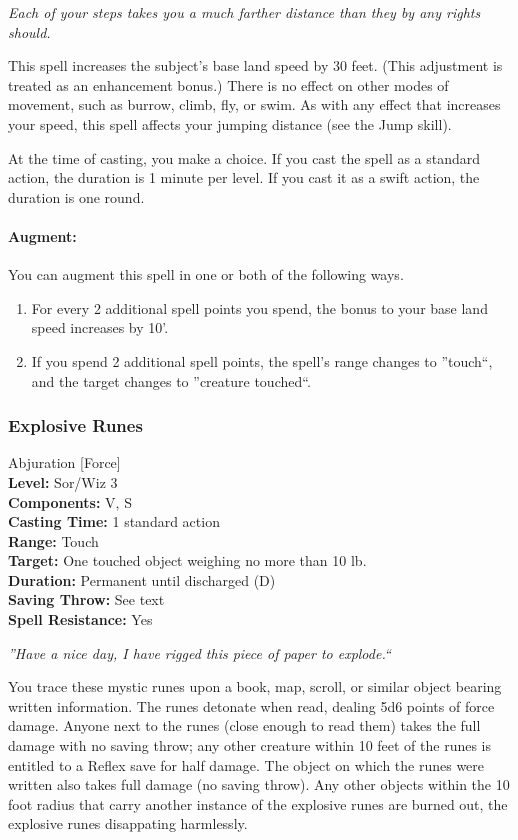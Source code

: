 \emph{Each of your steps takes you a much farther distance than they by any rights should.}

This spell increases the subject's base land speed by 30 feet. (This adjustment is treated as an enhancement bonus.) 
There is no effect on other modes of movement, such as burrow, climb, fly, or swim. 
As with any effect that increases your speed, this spell affects your jumping distance (see the Jump skill).

At the time of casting, you make a choice. If you cast the spell as a standard action, the duration is 1 minute per level. 
If you cast it as a swift action, the duration is one round.

\paragraph{Augment:}  You can augment this spell in one or both of the following ways.
\begin{enumerate}
 \item For every 2 additional spell points you spend, the bonus to your base land speed increases by 10'.
 \item If you spend 2 additional spell points, the spell's range changes to ''touch``, and the target changes to ''creature touched``. 
\end{enumerate}
\subsubsection{Explosive Runes}
\label{Spell:ExplosiveRunes}
Abjuration [Force]
\\ \textbf{Level:} Sor/Wiz 3
\\ \textbf{Components:} V, S
\\ \textbf{Casting Time:} 1 standard action
\\ \textbf{Range:} Touch
\\ \textbf{Target:} One touched object weighing no more than 10 lb.
\\ \textbf{Duration:} Permanent until discharged (D)
\\ \textbf{Saving Throw:} See text
\\ \textbf{Spell Resistance:} Yes

\emph{''Have a nice day, I have rigged this piece of paper to explode.``}

You trace these mystic runes upon a book, map, scroll, or similar object bearing written information. 
The runes detonate when read, dealing 5d6 points of force damage. 
Anyone next to the runes (close enough to read them) takes the full damage with no saving throw; 
any other creature within 10 feet of the runes is entitled to a Reflex save for half damage. 
The object on which the runes were written also takes full damage (no saving throw).
Any other objects within the 10 foot radius that carry another instance of the explosive runes
are burned out, the explosive runes disappating harmlessly.

